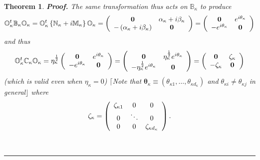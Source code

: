 \documentclass[aps,preprint]{revtex4}%
\newtheorem{theorem}{Theorem}
\newenvironment{proof}[1][Proof]{\noindent\textbf{#1.} }{\ \rule{0.5em}{0.5em}}
\begin{document}
\begin{theorem}
\begin{proof}
The same transformation thus acts on $\mathbb{B}_{\kappa}$ to produce
\begin{equation}
\mathbb{O}_{\kappa}^{t}\mathbb{B}_{\kappa}\mathbb{O}_{\kappa}=\mathbb{O}%
_{\kappa}^{t}\left\{  \mathbb{N}_{\kappa}+i\mathbb{M}_{\kappa}\right\}
\mathbb{O}_{\kappa}=\left(
\begin{array}
[c]{cc}%
\mathbf{0} & \mathbf{\alpha}_{\kappa}+i\mathbf{\beta}_{\kappa}\\
-\left(  \mathbf{\alpha}_{\kappa}+i\mathbf{\beta}_{\kappa}\right)  &
\mathbf{0}%
\end{array}
\right)  =\left(
\begin{array}
[c]{cc}%
\mathbf{0} & e^{i\mathbf{\theta}_{\kappa}}\\
-e^{i\mathbf{\theta}_{\kappa}} & \mathbf{0}%
\end{array}
\right)
\end{equation}
and thus%
\begin{equation}
\mathbb{O}_{\kappa}^{t}\mathbb{C}_{\kappa}\mathbb{O}_{\kappa}=\eta_{\kappa
}^{\frac{1}{2}}\left(
\begin{array}
[c]{cc}%
\mathbf{0} & e^{i\mathbf{\theta}_{\kappa}}\\
-e^{i\mathbf{\theta}_{\kappa}} & \mathbf{0}%
\end{array}
\right)  =\left(
\begin{array}
[c]{cc}%
\mathbf{0} & \eta_{\kappa}^{\frac{1}{2}}e^{i\mathbf{\theta}_{\kappa}}\\
-\eta_{\kappa}^{\frac{1}{2}}e^{i\mathbf{\theta}_{\kappa}} & \mathbf{0}%
\end{array}
\right)  =\left(
\begin{array}
[c]{cc}%
\mathbf{0} & \mathbf{\zeta}_{\kappa}\\
-\mathbf{\zeta}_{\kappa} & \mathbf{0}%
\end{array}
\right)
\end{equation}
(which is valid even when $\eta_{\kappa}=0$) $\lceil$Note that $\mathbf{\theta
}_{\kappa}\equiv\left(  \theta_{\kappa1},\ldots,\theta_{\kappa d_{\kappa}%
}\right)  $ and $\theta_{\kappa i}\neq\theta_{\kappa j}$ in general$\rfloor$
where
\begin{equation}
\mathbf{\zeta}_{\kappa}=\left(
\begin{array}
[c]{ccc}%
\zeta_{\kappa1} & 0 & 0\\
0 & \ddots & 0\\
0 & 0 & \zeta_{\kappa d_{\kappa}}%
\end{array}
\right)  .
\end{equation}

\end{proof}
\end{theorem}
\end{document}
